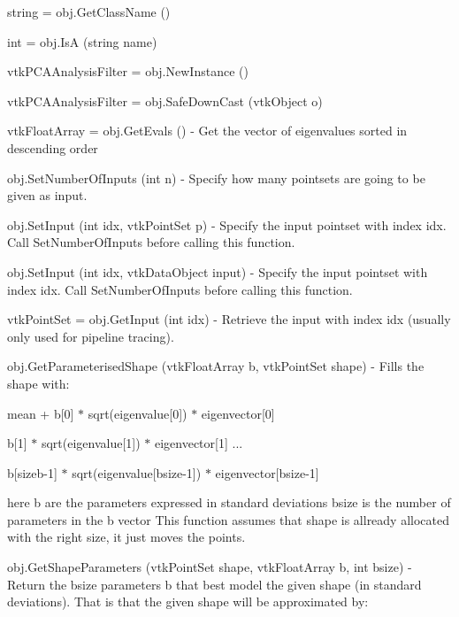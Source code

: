 \begin{DoxyItemize}
\item {\ttfamily string = obj.\-Get\-Class\-Name ()}  
\item {\ttfamily int = obj.\-Is\-A (string name)}  
\item {\ttfamily vtk\-P\-C\-A\-Analysis\-Filter = obj.\-New\-Instance ()}  
\item {\ttfamily vtk\-P\-C\-A\-Analysis\-Filter = obj.\-Safe\-Down\-Cast (vtk\-Object o)}  
\item {\ttfamily vtk\-Float\-Array = obj.\-Get\-Evals ()} -\/ Get the vector of eigenvalues sorted in descending order  
\item {\ttfamily obj.\-Set\-Number\-Of\-Inputs (int n)} -\/ Specify how many pointsets are going to be given as input.  
\item {\ttfamily obj.\-Set\-Input (int idx, vtk\-Point\-Set p)} -\/ Specify the input pointset with index idx. Call Set\-Number\-Of\-Inputs before calling this function.  
\item {\ttfamily obj.\-Set\-Input (int idx, vtk\-Data\-Object input)} -\/ Specify the input pointset with index idx. Call Set\-Number\-Of\-Inputs before calling this function.  
\item {\ttfamily vtk\-Point\-Set = obj.\-Get\-Input (int idx)} -\/ Retrieve the input with index idx (usually only used for pipeline tracing).  
\item {\ttfamily obj.\-Get\-Parameterised\-Shape (vtk\-Float\-Array b, vtk\-Point\-Set shape)} -\/ Fills the shape with\-:

mean + b\mbox{[}0\mbox{]} $\ast$ sqrt(eigenvalue\mbox{[}0\mbox{]}) $\ast$ eigenvector\mbox{[}0\mbox{]}
\begin{DoxyItemize}
\item b\mbox{[}1\mbox{]} $\ast$ sqrt(eigenvalue\mbox{[}1\mbox{]}) $\ast$ eigenvector\mbox{[}1\mbox{]} ...
\item b\mbox{[}sizeb-\/1\mbox{]} $\ast$ sqrt(eigenvalue\mbox{[}bsize-\/1\mbox{]}) $\ast$ eigenvector\mbox{[}bsize-\/1\mbox{]}
\end{DoxyItemize}

here b are the parameters expressed in standard deviations bsize is the number of parameters in the b vector This function assumes that shape is allready allocated with the right size, it just moves the points.  
\item {\ttfamily obj.\-Get\-Shape\-Parameters (vtk\-Point\-Set shape, vtk\-Float\-Array b, int bsize)} -\/ Return the bsize parameters b that best model the given shape (in standard deviations). That is that the given shape will be approximated by\-:


\end{DoxyItemize}
